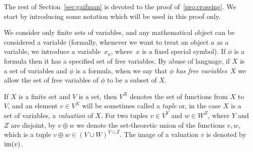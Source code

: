 The rest of Section~\ref{sec:gaifman} is devoted to the proof of~\cref{pro:crossing}.
We start by introducing some notation which will be used in this proof only.

We consider only finite sets of variables, and any mathematical object can be considered a variable 
(formally, whenever we want to treat an object $a$ as a variable, we introduce a variable~$x_a$, where~$x$ is a fixed special symbol).
If $\phi$ is a formula then it has a specified set of free variables.
By abuse of language, if $X$ is a set of variables and $\phi$
is a formula, when we say that $\phi$ \emph{has free variables}~$X$
we allow the set of free variables of $\phi$ to be a subset of $X$.

If $X$ is a finite set and $V$ is a set, then $V^X$ denotes the set of functions from $X$ to $V$, and an element $v\in V^X$ will be sometimes called a \emph{tuple} 
or, in the case $X$ is a set of variables, a \emph{valuation} of $X$.
For two tuples
$v\in V^Y$ and $w\in  W^Z$, where $Y$ and $Z$ are disjoint, by
$v\oplus w$ we denote the set-theoretic union of the functions $v,w$,
which is a tuple $v\oplus w\in (V\cup W)^{Y\cup Z}$.
The image of a valuation $v$ is denoted by $\mathrm{im}(v)$.



